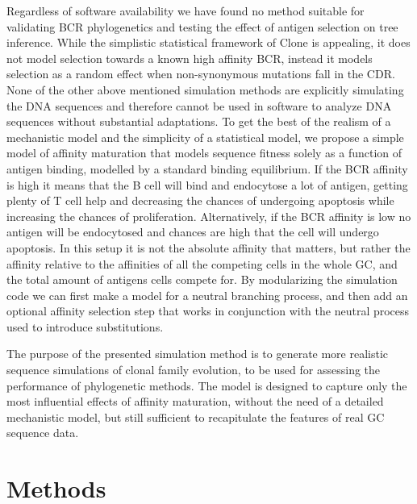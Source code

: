 Regardless of software availability we have found no method suitable for validating BCR phylogenetics and testing the effect of antigen selection on tree inference.
While the simplistic statistical framework of Clone is appealing, it does not model selection towards a known high affinity BCR, instead it models selection as a random effect when non-synonymous mutations fall in the CDR.
None of the other above mentioned simulation methods are explicitly simulating the DNA sequences and therefore cannot be used in software to analyze DNA sequences without substantial adaptations.
To get the best of the realism of a mechanistic model and the simplicity of a statistical model, we propose a simple model of affinity maturation that models sequence fitness solely as a function of antigen binding, modelled by a standard binding equilibrium.
If the BCR affinity is high it means that the B cell will bind and endocytose a lot of antigen, getting plenty of T cell help and decreasing the chances of undergoing apoptosis while increasing the chances of proliferation.
Alternatively, if the BCR affinity is low no antigen will be endocytosed and chances are high that the cell will undergo apoptosis.
In this setup it is not the absolute affinity that matters, but rather the affinity relative to the affinities of all the competing cells in the whole GC, and the total amount of antigens cells compete for.
By modularizing the simulation code we can first make a model for a neutral branching process, and then add an optional affinity selection step that works in conjunction with the neutral process used to introduce substitutions.

The purpose of the presented simulation method is to generate more realistic sequence simulations of clonal family evolution, to be used for assessing the performance of phylogenetic methods.
The model is designed to capture only the most influential effects of affinity maturation, without the need of a detailed mechanistic model, but still sufficient to recapitulate the features of real GC sequence data.






\section{Methods}


